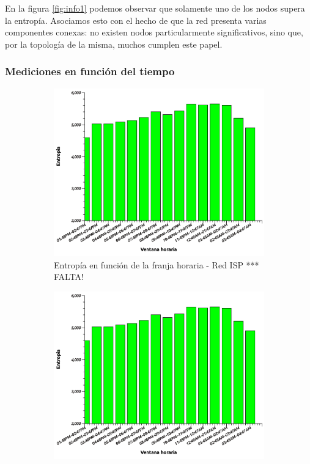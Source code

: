En la figura \ref{fig:info1} podemos observar que solamente uno de los nodos supera la entrop\'ia. Asociamos esto con el hecho de que la red presenta varias componentes conexas: no existen nodos particularmente significativos, sino que, por la topolog\'ia de la misma, muchos cumplen este papel.



\subsubsection{Mediciones en funci\'on del tiempo}

\begin{figure}[H]
        \begin{subfigure}[H]{0.5\textwidth}
                \centering
                \includegraphics[width=1\textwidth]{graficos/entropiaXHora.pdf}
                \caption{Entrop\'ia en funci\'on de la franja horaria - Red ISP  *** FALTA!}
                \label{fig:paquetes1}
        \end{subfigure}
        \begin{subfigure}[H]{0.5\textwidth}
                \centering
                \includegraphics[width=1\textwidth]{graficos/entropiaXHora.pdf}

\end{subfigure}
\end{figure}

